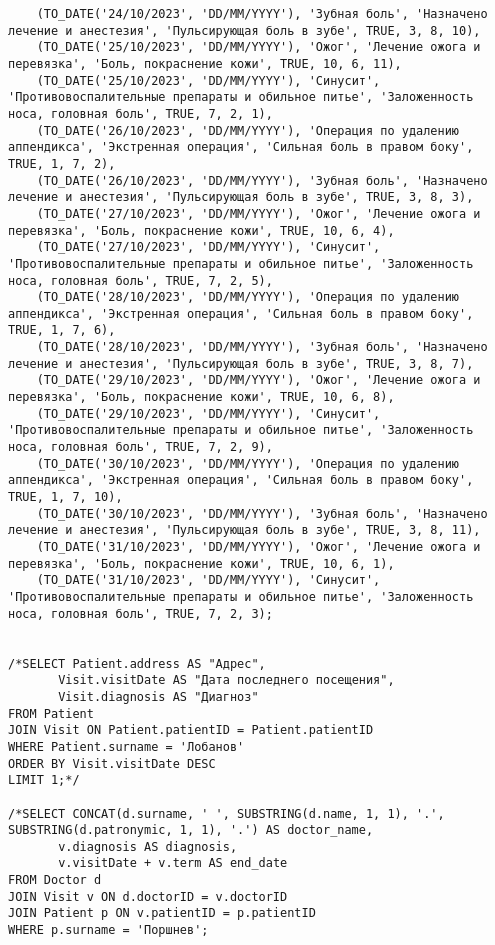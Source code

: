 \documentclass{article}
\begin{document}
{\begin{verbatim}
    (TO_DATE('24/10/2023', 'DD/MM/YYYY'), 'Зубная боль', 'Назначено лечение и анестезия', 'Пульсирующая боль в зубе', TRUE, 3, 8, 10),
    (TO_DATE('25/10/2023', 'DD/MM/YYYY'), 'Ожог', 'Лечение ожога и перевязка', 'Боль, покраснение кожи', TRUE, 10, 6, 11),
    (TO_DATE('25/10/2023', 'DD/MM/YYYY'), 'Синусит', 'Противовоспалительные препараты и обильное питье', 'Заложенность носа, головная боль', TRUE, 7, 2, 1),
    (TO_DATE('26/10/2023', 'DD/MM/YYYY'), 'Операция по удалению аппендикса', 'Экстренная операция', 'Сильная боль в правом боку', TRUE, 1, 7, 2),
    (TO_DATE('26/10/2023', 'DD/MM/YYYY'), 'Зубная боль', 'Назначено лечение и анестезия', 'Пульсирующая боль в зубе', TRUE, 3, 8, 3),
    (TO_DATE('27/10/2023', 'DD/MM/YYYY'), 'Ожог', 'Лечение ожога и перевязка', 'Боль, покраснение кожи', TRUE, 10, 6, 4),
    (TO_DATE('27/10/2023', 'DD/MM/YYYY'), 'Синусит', 'Противовоспалительные препараты и обильное питье', 'Заложенность носа, головная боль', TRUE, 7, 2, 5),
    (TO_DATE('28/10/2023', 'DD/MM/YYYY'), 'Операция по удалению аппендикса', 'Экстренная операция', 'Сильная боль в правом боку', TRUE, 1, 7, 6),
    (TO_DATE('28/10/2023', 'DD/MM/YYYY'), 'Зубная боль', 'Назначено лечение и анестезия', 'Пульсирующая боль в зубе', TRUE, 3, 8, 7),
    (TO_DATE('29/10/2023', 'DD/MM/YYYY'), 'Ожог', 'Лечение ожога и перевязка', 'Боль, покраснение кожи', TRUE, 10, 6, 8),
    (TO_DATE('29/10/2023', 'DD/MM/YYYY'), 'Синусит', 'Противовоспалительные препараты и обильное питье', 'Заложенность носа, головная боль', TRUE, 7, 2, 9),
    (TO_DATE('30/10/2023', 'DD/MM/YYYY'), 'Операция по удалению аппендикса', 'Экстренная операция', 'Сильная боль в правом боку', TRUE, 1, 7, 10),
    (TO_DATE('30/10/2023', 'DD/MM/YYYY'), 'Зубная боль', 'Назначено лечение и анестезия', 'Пульсирующая боль в зубе', TRUE, 3, 8, 11),
    (TO_DATE('31/10/2023', 'DD/MM/YYYY'), 'Ожог', 'Лечение ожога и перевязка', 'Боль, покраснение кожи', TRUE, 10, 6, 1),
    (TO_DATE('31/10/2023', 'DD/MM/YYYY'), 'Синусит', 'Противовоспалительные препараты и обильное питье', 'Заложенность носа, головная боль', TRUE, 7, 2, 3);

	
/*SELECT Patient.address AS "Адрес",
       Visit.visitDate AS "Дата последнего посещения",
       Visit.diagnosis AS "Диагноз"
FROM Patient
JOIN Visit ON Patient.patientID = Patient.patientID
WHERE Patient.surname = 'Лобанов'
ORDER BY Visit.visitDate DESC
LIMIT 1;*/

/*SELECT CONCAT(d.surname, ' ', SUBSTRING(d.name, 1, 1), '.', SUBSTRING(d.patronymic, 1, 1), '.') AS doctor_name,
       v.diagnosis AS diagnosis,
       v.visitDate + v.term AS end_date
FROM Doctor d
JOIN Visit v ON d.doctorID = v.doctorID
JOIN Patient p ON v.patientID = p.patientID
WHERE p.surname = 'Поршнев';


\end{verbatim}}
\end{document}
